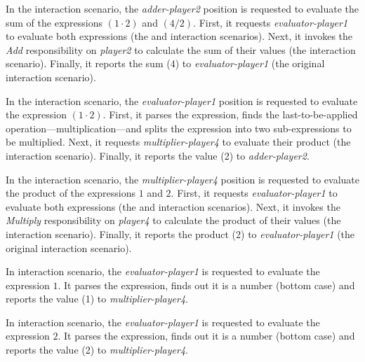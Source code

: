 In the {} interaction scenario, the \textit{adder-player2} position is requested to evaluate the sum of the expressions $(1\cdot2)$ and $(4/2)$.
First, it requests \textit{evaluator-player1} to evaluate both expressions (the {} and {} interaction scenarios).
Next, it invokes the \textit{Add} responsibility on \textit{player2} to calculate the sum of their values (the {} interaction scenario).
Finally, it reports the sum (4) to \textit{evaluator-player1} (the original {} interaction scenario).

In the {} interaction scenario, the \textit{evaluator-player1} position is requested to evaluate the expression $(1\cdot2)$.
First, it parses the expression, finds the last-to-be-applied operation---multiplication---and splits the expression into two sub-expressions to be multiplied.
Next, it requests \textit{multiplier-player4} to evaluate their product (the {} interaction scenario).
Finally, it reports the value (2) to \textit{adder-player2}.

In the {} interaction scenario, the \textit{multiplier-player4} position is requested to evaluate the product of the expressions $1$ and $2$.
First, it requests \textit{evaluator-player1} to evaluate both expressions (the {} and {} interaction scenarios).
Next, it invokes the \textit{Multiply} responsibility on \textit{player4} to calculate the product of their values (the {} interaction scenario).
Finally, it reports the product (2) to \textit{evaluator-player1} (the original {} interaction scenario).

In {} interaction scenario, the \textit{evaluator-player1} is requested to evaluate the expression $1$.
It parses the expression, finds out it is a number (bottom case) and reports the value (1) to \textit{multiplier-player4}.

In {} interaction scenario, the \textit{evaluator-player1} is requested to evaluate the expression $2$.
It parses the expression, finds out it is a number (bottom case) and reports the value (2) to \textit{multiplier-player4}.

